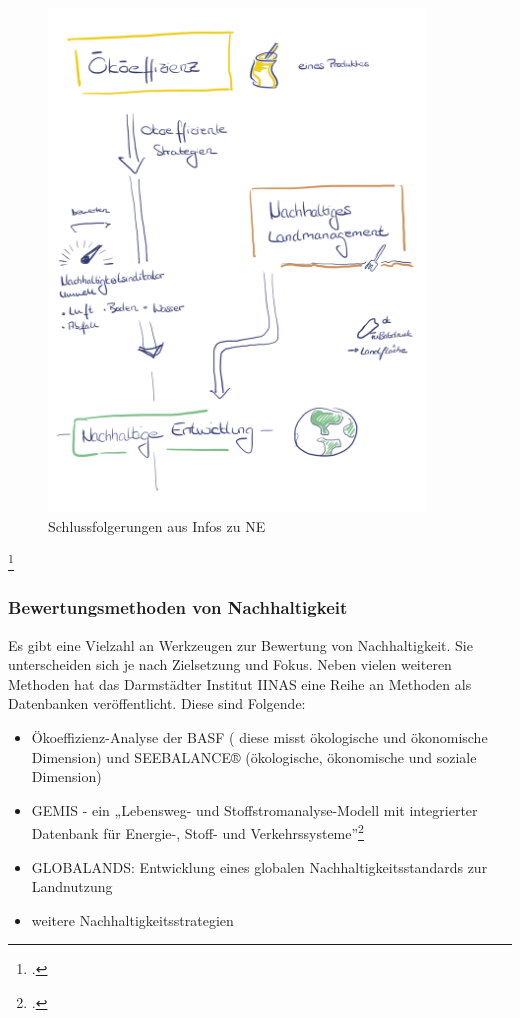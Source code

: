 \documentclass{scrartcl}
\begin{document}
   
\begin{figure}[htbp]
\centering
\includegraphics[width=10cm]{image_folder/NE_folgerungen.png}
\caption{Schlussfolgerungen aus Infos zu NE}
\label{fig:Folgerung_NE}
\end{figure}\footcite{Eigene Darstellung}

\subsubsection{Bewertungsmethoden von Nachhaltigkeit}
Es gibt eine Vielzahl an Werkzeugen zur Bewertung von Nachhaltigkeit. Sie unterscheiden sich je nach Zielsetzung und Fokus. Neben vielen weiteren Methoden hat das Darmstädter Institut IINAS eine Reihe an Methoden als Datenbanken veröffentlicht. Diese sind Folgende:

\begin{itemize}
\item Ökoeffizienz-Analyse der BASF ( diese misst ökologische und ökonomische Dimension) und SEEBALANCE® (ökologische, ökonomische und soziale Dimension)
\item GEMIS - ein „Lebensweg- und Stoffstromanalyse-Modell mit integrierter Datenbank für Energie-, Stoff- und Verkehrssysteme”\footcite{}
\item GLOBALANDS: Entwicklung eines globalen Nachhaltigkeitsstandards zur Landnutzung
\item weitere Nachhaltigkeitsstrategien
\end{itemize}
\end{document}
